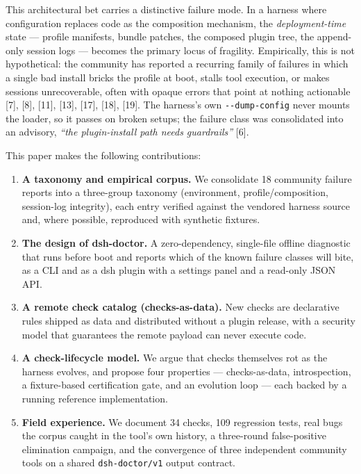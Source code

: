 \documentclass[
]{article}
\begin{document}
This architectural bet carries a distinctive failure mode. In a harness
where configuration replaces code as the composition mechanism, the
\emph{deployment-time} state --- profile manifests, bundle patches, the
composed plugin tree, the append-only session logs --- becomes the
primary locus of fragility. Empirically, this is not hypothetical: the
community has reported a recurring family of failures in which a single
bad install bricks the profile at boot, stalls tool execution, or makes
sessions unrecoverable, often with opaque errors that point at nothing
actionable {[}7{]}, {[}8{]}, {[}11{]}, {[}13{]}, {[}17{]}, {[}18{]},
{[}19{]}. The harness's own \texttt{-\/-dump-config} never mounts the
loader, so it passes on broken setups; the failure class was
consolidated into an advisory, \emph{``the plugin-install path needs
guardrails''} {[}6{]}.

This paper makes the following contributions:

\begin{enumerate}
\def\labelenumi{\arabic{enumi}.}
\item
  \textbf{A taxonomy and empirical corpus.} We consolidate 18 community
  failure reports into a three-group taxonomy (environment,
  profile/composition, session-log integrity), each entry verified
  against the vendored harness source and, where possible, reproduced
  with synthetic fixtures.
\item
  \textbf{The design of dsh-doctor.} A zero-dependency, single-file
  offline diagnostic that runs before boot and reports which of the
  known failure classes will bite, as a CLI and as a dsh plugin with a
  settings panel and a read-only JSON API.
\item
  \textbf{A remote check catalog (checks-as-data).} New checks are
  declarative rules shipped as data and distributed without a plugin
  release, with a security model that guarantees the remote payload can
  never execute code.
\item
  \textbf{A check-lifecycle model.} We argue that checks themselves rot
  as the harness evolves, and propose four properties ---
  checks-as-data, introspection, a fixture-based certification gate, and
  an evolution loop --- each backed by a running reference
  implementation.
\item
  \textbf{Field experience.} We document 34 checks, 109 regression tests,
  real bugs the corpus caught in the tool's own history, a three-round
  false-positive elimination campaign, and the convergence of three
  independent community tools on a shared \texttt{dsh-doctor/v1} output
  contract.
\end{enumerate}
\end{document}
